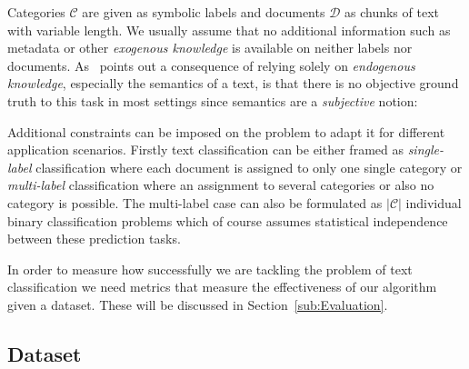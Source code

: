Categories $\mathcal{C}$ are given as symbolic labels and documents $\mathcal{D}$ as chunks of text with variable length. We usually assume that no additional information such as metadata or other \emph{exogenous knowledge} is available on neither labels nor documents.
As~\cite{Sebastiani:2002aa} points out a consequence of relying solely on \emph{endogenous knowledge}, especially the semantics of a text, is that there is no objective ground truth to this task in most settings since semantics are a \emph{subjective} notion: ~\cite{Sebastiani:2002aa}

Additional constraints can be imposed on the problem to adapt it for different application scenarios. Firstly text classification can be either framed as \emph{single-label} classification where each document is assigned to only one single category or \emph{multi-label} classification where an assignment to several categories or also no category is possible. The multi-label case can also be formulated as $|\mathcal{C}|$ individual binary classification problems which of course assumes statistical independence between these prediction tasks.

In order to measure how successfully we are tackling the problem of text classification we need metrics that measure the effectiveness of our algorithm given a dataset. These will be discussed in Section~\ref{sub:Evaluation}.

\subsection{Dataset}
\label{subs:Dataset}
